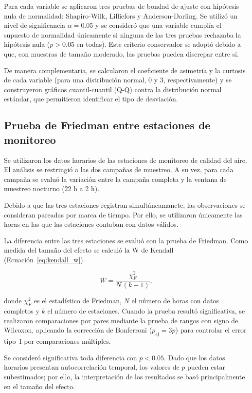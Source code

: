 Para cada variable se aplicaron tres pruebas de bondad de ajuste con hipótesis nula 
de normalidad: Shapiro-Wilk, Lilliefors y Anderson-Darling. Se utilizó un nivel de significancia $\alpha = 0.05$ 
y se consideró que una variable cumplía el supuesto de normalidad únicamente si ninguna de 
las tres pruebas rechazaba la hipótesis nula ($p > 0.05$ en todas). Este criterio conservador 
se adoptó debido a que, con muestras de tamaño moderado, las pruebas pueden discrepar entre sí.

De manera complementaria, se calcularon el coeficiente de asimetría y la curtosis de 
cada variable (para una distribución normal, 0 y 3, respectivamente) y se construyeron 
gráficos cuantil-cuantil (Q-Q) contra la distribución normal estándar, que permitieron 
identificar el tipo de desviación.

\subsection{Prueba de Friedman entre estaciones de monitoreo}
\label{subsec:comparacion_estaciones}
Se utilizaron los datos horarios de las estaciones de monitoreo de calidad del aire.
El análisis se restringió a las dos campañas de muestreo. A su vez, para cada 
campaña se evaluó la variación entre la campaña completa y la ventana de muestreo 
nocturno (22 h a 2 h). 

Debido a que las tres estaciones registran simultáneamanete, las observaciones 
se consideran pareadas por marca de tiempo. Por ello, se utilizaron únicamente 
las horas en las que las estaciones contaban con datos válidos. 

La diferencia entre las tres estaciones se evaluó con la prueba de Friedman. 
Como medida del tamaño del efecto se calculó la W de Kendall (Ecuación~\ref{eq:kendall_w}). 

\begin{equation}
  W = \frac{\chi^2_F}{N\,(k-1)},
  \label{eq:kendall_w}
\end{equation}

donde $\chi^2_F$ es el estadístico de Friedman, $N$ el número de horas con datos
completos y $k$ el número de estaciones. Cuando la prueba resultó significativa,
se realizaron comparaciones por pares mediante la prueba de rangos con signo de
Wilcoxon, aplicando la corrección de Bonferroni ($p_{\mathrm{aj}} = 3p$) para
controlar el error tipo~I por comparaciones múltiples. 

Se consideró significativa toda diferencia con $p < 0.05$. Dado que los datos
horarios presentan autocorrelación temporal, los valores de $p$ pueden estar
subestimados; por ello, la interpretación de los resultados se basó
principalmente en el tamaño del efecto.

